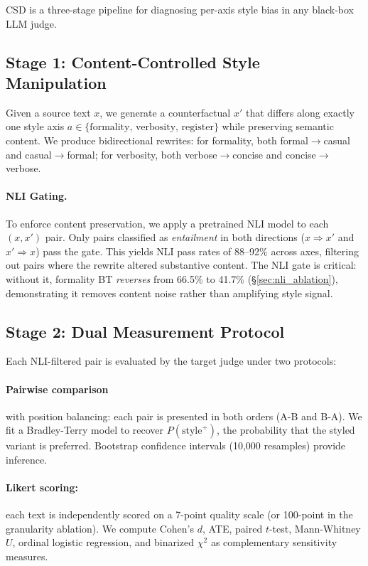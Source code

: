 \documentclass[11pt,twocolumn]{article}
\begin{document}
CSD is a three-stage pipeline for diagnosing per-axis style bias in any black-box LLM judge.

\subsection{Stage 1: Content-Controlled Style Manipulation}
\label{sec:manipulation}

Given a source text $x$, we generate a counterfactual $x'$ that differs along exactly one style axis $a \in \{\text{formality, verbosity, register}\}$ while preserving semantic content. We produce bidirectional rewrites: for formality, both formal$\to$casual and casual$\to$formal; for verbosity, both verbose$\to$concise and concise$\to$verbose.

\paragraph{NLI Gating.}
To enforce content preservation, we apply a pretrained NLI model to each $(x, x')$ pair. Only pairs classified as \emph{entailment} in both directions ($x \Rightarrow x'$ and $x' \Rightarrow x$) pass the gate. This yields NLI pass rates of 88--92\% across axes, filtering out pairs where the rewrite altered substantive content. The NLI gate is critical: without it, formality BT \emph{reverses} from 66.5\% to 41.7\% (\S\ref{sec:nli_ablation}), demonstrating it removes content noise rather than amplifying style signal.

\subsection{Stage 2: Dual Measurement Protocol}
\label{sec:dual}

Each NLI-filtered pair is evaluated by the target judge under two protocols:

\paragraph{Pairwise comparison} with position balancing: each pair is presented in both orders (A-B and B-A). We fit a Bradley-Terry model to recover $P(\text{style}^+)$, the probability that the styled variant is preferred. Bootstrap confidence intervals (10,000 resamples) provide inference.

\paragraph{Likert scoring:} each text is independently scored on a 7-point quality scale (or 100-point in the granularity ablation). We compute Cohen's $d$, ATE, paired $t$-test, Mann-Whitney $U$, ordinal logistic regression, and binarized $\chi^2$ as complementary sensitivity measures.
\end{document}
